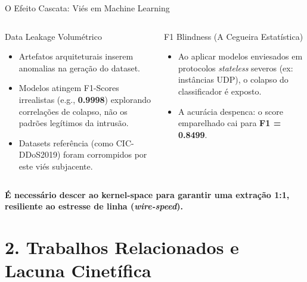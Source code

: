 \documentclass[aspectratio=169, 10pt]{beamer}
\begin{document}
\begin{frame}{O Efeito Cascata: Viés em Machine Learning}
  \begin{columns}[T]
      \begin{block}{Data Leakage Volumétrico}
        \begin{itemize}
          \item Artefatos arquiteturais inserem anomalias na geração do dataset.
          \item Modelos atingem F1-Scores irrealistas (e.g., \textbf{0.9998}) explorando correlações de colapso, não os padrões legítimos da intrusão.
          \item Datasets referência (como CIC-DDoS2019) foram corrompidos por este viés subjacente.
        \end{itemize}
      \end{block}

      \begin{block}{F1 Blindness (A Cegueira Estatística)}
        \begin{itemize}
          \item Ao aplicar modelos enviesados em protocolos \textit{stateless} severos (ex: instâncias UDP), o colapso do classificador é exposto.
          \item A acurácia despenca: o score emparelhado cai para \textbf{F1 = 0.8499}.
        \end{itemize}
      \end{block}
  \end{columns}
  \vspace{1.0em}
  \begin{center}
    \large\textbf{\color{PrimaryDark} É necessário descer ao kernel-space para garantir uma extração 1:1, resiliente ao estresse de linha (\textit{wire-speed}).}
  \end{center}
\end{frame}

\section{2. Trabalhos Relacionados e Lacuna Cinetífica}
\end{document}
